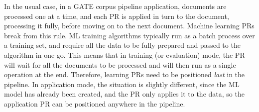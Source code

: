 In the usual case, in a GATE corpus pipeline application, documents
are processed one at a time, and each PR is applied in turn to the
document, processing it fully, before moving on to the next
document. Machine learning PRs break from this rule. ML training
algorithms typically run as a batch process over a training set, and
require all the data to be fully prepared and passed to the algorithm
in one go. This means that in training (or evaluation) mode, the PR
will wait for all the documents to be processed and will then run as a
single operation at the end. Therefore, learning PRs need to be
positioned
\textit{last} in the pipeline. In application mode, the situation
is slightly different, since the ML model has already been created,
and the PR only applies it to the data, so the application PR can be
positioned anywhere in the pipeline.
